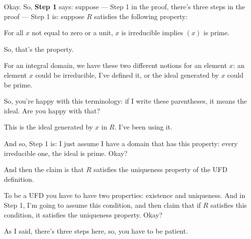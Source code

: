 \begin{speech}[00:32:16 - 00:33:39]
Okay. So, \textbf{Step 1}  says: suppose --- Step 1 in the proof, there's three steps in the proof --- Step 1 is: suppose  $R$ satisfies the following property: 

For all $x$ not equal to zero or a unit,  $x$ is irreducible  implies  $(x)$ is prime.

So, that's the property. 

For an integral domain, we have these two different notions for an element $x$: an element $x$ could be irreducible, I've defined it, or the ideal generated by $x$ could be prime.

So, you're happy with this terminology: if I write these parentheses, it means the ideal. Are you happy with that?

This is the ideal  generated by $x$ in $R$. I've been using it.

And so, Step 1 is: I just assume I have a domain that has this property: every irreducible one, the ideal is prime. Okay?

And then the claim  is that $R$ satisfies  the uniqueness property  of the UFD definition.

To be a UFD you have to have two properties: existence and uniqueness. And in Step 1, I'm going to assume this condition, and then claim that if $R$ satisfies this condition, it satisfies the uniqueness property. Okay?

As I said, there's three steps here, so, you have to be patient.
\end{speech}

